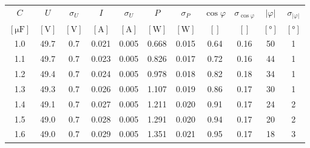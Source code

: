 \begin{tabular}{
    S[table-format=1.0]
    S[table-format=2.1]
    S[table-format=1.1]
    S[table-format=1.3]
    S[table-format=1.3]
    S[table-format=1.3]
    S[table-format=1.3]
    S[table-format=1.2]
    S[table-format=1.2]
    S[table-format=2.0]
    S[table-format=2.0]
} \toprule
{$C$}                   & {$U$}            & {$\sigma_U$}     & {$I$}              & {$\sigma_U$}       & {$P$}            & {$\sigma_P$}     & {$\cos \varphi$} & {$\sigma_{\cos \varphi}$} & {$|\varphi|$}      & {$\sigma_{|\varphi|}$} \\
{$[\si{\micro\farad}]$} & {$[\si{\volt}]$} & {$[\si{\volt}]$} & {$[\si{\ampere}]$} & {$[\si{\ampere}]$} & {$[\si{\watt}]$} & {$[\si{\watt}]$} & {$[]$}           & {$[]$}                    & {$[\si{\degree}]$} & {$[\si{\degree}]$}     \\                      & 49.7             & 0.7              & 0.021              & 0.005              & 0.668            & 0.015            & 0.64             & 0.16                      & 50                 & 1                      \\
1.1                     & 49.7             & 0.7              & 0.023              & 0.005              & 0.826            & 0.017            & 0.72             & 0.16                      & 44                 & 1                      \\
1.2                     & 49.4             & 0.7              & 0.024              & 0.005              & 0.978            & 0.018            & 0.82             & 0.18                      & 34                 & 1                      \\
1.3                     & 49.3             & 0.7              & 0.026              & 0.005              & 1.107            & 0.019            & 0.86             & 0.17                      & 30                 & 1                      \\
1.4                     & 49.1             & 0.7              & 0.027              & 0.005              & 1.211            & 0.020            & 0.91             & 0.17                      & 24                 & 2                      \\
1.5                     & 49.0             & 0.7              & 0.028              & 0.005              & 1.291            & 0.020            & 0.94             & 0.17                      & 20                 & 2                      \\
1.6                     & 49.0             & 0.7              & 0.029              & 0.005              & 1.351            & 0.021            & 0.95             & 0.17                      & 18                 & 3                      \\

\end{tabular}
